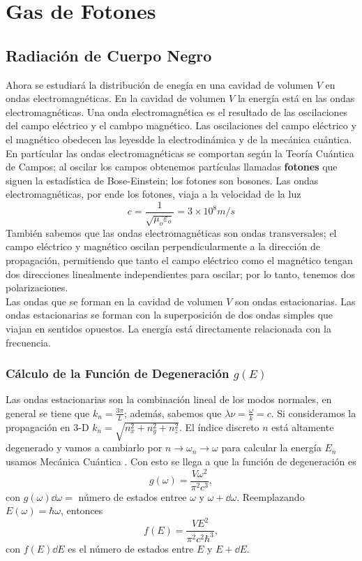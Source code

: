 \chapter{Gas de Fotones}

\section{Radiación de Cuerpo Negro}
Ahora se estudiará la distribución de enegía en una cavidad de volumen $V$ en ondas electromagnéticas. En la cavidad de volumen $V$ la energía está en las ondas electromagnéticas. Una onda electromagnética es el resultado de las oscilaciones del campo eléctrico y el cambpo magnético. Las oscilaciones del campo eléctrico y el magnético obedecen las leyesdde la electrodinámica y de la mecánica cuántica. En partícular las ondas electromagnéticas se comportan según la Teoría Cuántica de Campos; al oscilar los campos obtenemos partículas llamadas \textbf{fotones} que siguen la estadística de Bose-Einstein; los fotones son bosones. Las ondas electromagnéticas, por ende los fotones, viaja a la velocidad de la luz
	$$ c = \frac{1}{\sqrt{\mu _o \varepsilon _o}} = 3\times 10^8 m/s $$
También sabemos que las ondas electromagnéticas son ondas transversales; el campo eléctrico y magnético oscilan perpendicularmente a la dirección de propagación, permitiendo que tanto el campo eléctrico como el magnético tengan dos direcciones linealmente independientes para oscilar; por lo tanto, tenemos dos polarizaciones. \\
Las ondas que se forman en la cavidad de volumen $V$ son ondas estacionarias. Las ondas estacionarias se forman con la superposición de dos ondas simples que viajan en sentidos opuestos. La energía está directamente relacionada con la frecuencia.

\subsection{Cálculo de la Función de Degeneración $g(E)$}
Las ondas estacionarias son la combinación lineal de los modos normales, en general se tiene que $k_n = \frac{3\pi}{L}$; además, sabemos que $\lambda \nu = \frac{\omega}{k} = c$. Si consideramos la propagación en 3-D $k_n = \sqrt{n_x ^2 + n_y ^2 + n_z ^2}$. El índice discreto $n$ está altamente degenerado y vamos a cambiarlo por $n\to \omega _n \to \omega$ para calcular la energía $E_n$ usamos Mecánica Cuántica . Con esto se llega a que la función de degeneración es
	$$ \boxed{ g(\omega) = \frac{V \omega ^2}{\pi ^2 c^3}, } $$
con $g(\omega) \dd{\omega} = $ número de estados entree $\omega$ y $\omega + \dd{\omega}$. Reemplazando $E(\omega) = \hbar \omega$, entonces
	$$ f(E) = \frac{VE^2}{\pi ^2 c^2 \hbar ^3}, $$
con $f(E) \dd{E}$ es el número de estados entre $E$ y $E + \dd{E}$. \\

